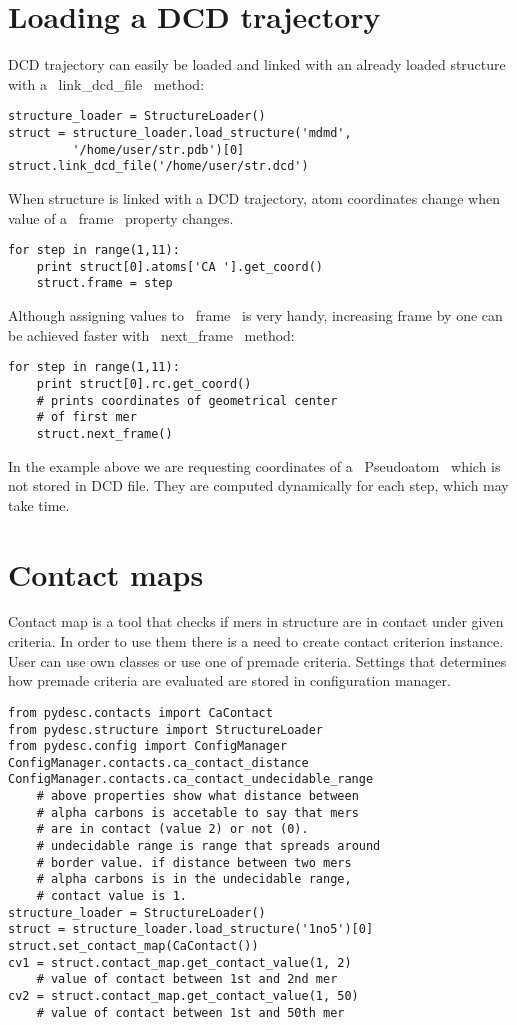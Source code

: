 \documentclass[a4paper,10pt]{article}
\begin{document}
\section{Loading a DCD trajectory}

DCD trajectory can easily be loaded and linked with an already loaded structure with a ~link_dcd_file~ method:

\begin{lstlisting}
structure_loader = StructureLoader()
struct = structure_loader.load_structure('mdmd',
		 '/home/user/str.pdb')[0]
struct.link_dcd_file('/home/user/str.dcd')
\end{lstlisting}

When structure is linked with a DCD trajectory, atom coordinates change when value of a ~frame~ property changes.

\begin{lstlisting}
for step in range(1,11):
	print struct[0].atoms['CA '].get_coord()
	struct.frame = step
\end{lstlisting}

Although assigning values to ~frame~ is very handy, increasing frame by one can be achieved faster with ~next_frame~ method:

\begin{lstlisting}
for step in range(1,11):
	print struct[0].rc.get_coord()
	# prints coordinates of geometrical center
	# of first mer
	struct.next_frame()
\end{lstlisting}

In the example above we are requesting coordinates of a ~Pseudoatom~ which is not stored in DCD file. They are computed dynamically for each step, which may take time.

\section{Contact maps}

Contact map is a tool that checks if mers in structure are in contact under given criteria. In order to use them there is a need to create contact criterion instance. User can use own classes or use one of premade criteria. Settings that determines how premade criteria are evaluated are stored in configuration manager.

\begin{lstlisting}
from pydesc.contacts import CaContact
from pydesc.structure import StructureLoader
from pydesc.config import ConfigManager
ConfigManager.contacts.ca_contact_distance
ConfigManager.contacts.ca_contact_undecidable_range
	# above properties show what distance between 
	# alpha carbons is accetable to say that mers
	# are in contact (value 2) or not (0).
	# undecidable range is range that spreads around
	# border value. if distance between two mers
	# alpha carbons is in the undecidable range,
	# contact value is 1.
structure_loader = StructureLoader()
struct = structure_loader.load_structure('1no5')[0]
struct.set_contact_map(CaContact())
cv1 = struct.contact_map.get_contact_value(1, 2)
	# value of contact between 1st and 2nd mer
cv2 = struct.contact_map.get_contact_value(1, 50)
	# value of contact between 1st and 50th mer
\end{lstlisting}
\end{document}
